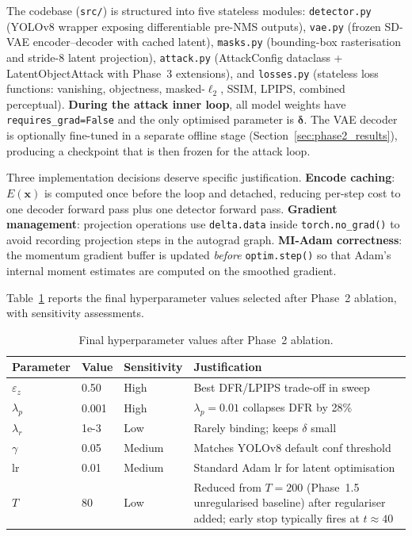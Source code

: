 \documentclass[12pt,a4paper]{report}
\begin{document}
The codebase (\texttt{src/}) is structured into five stateless modules:
\texttt{detector.py} (YOLOv8 wrapper exposing differentiable pre-NMS outputs),
\texttt{vae.py} (frozen SD-VAE encoder--decoder with cached latent),
\texttt{masks.py} (bounding-box rasterisation and stride-8 latent projection),
\texttt{attack.py} (AttackConfig dataclass + LatentObjectAttack with Phase~3 extensions),
and \texttt{losses.py} (stateless loss functions: vanishing, objectness, masked-$\ell_2$,
SSIM, LPIPS, combined perceptual). \textbf{During the attack inner loop}, all model
weights have \texttt{requires\_grad=False} and the only optimised parameter is
$\bm{\delta}$. The VAE decoder is optionally fine-tuned in a separate offline
stage (Section~\ref{sec:phase2_results}), producing a checkpoint that is then
frozen for the attack loop.

Three implementation decisions deserve specific justification.
\textbf{Encode caching}: $E(\mathbf{x})$ is computed once before the loop and detached,
reducing per-step cost to one decoder forward pass plus one detector forward pass.
\textbf{Gradient management}: projection operations use \texttt{delta.data} inside
\texttt{torch.no\_grad()} to avoid recording projection steps in the autograd graph.
\textbf{MI-Adam correctness}: the momentum gradient buffer is updated \emph{before}
\texttt{optim.step()} so that Adam's internal moment estimates are computed on the
smoothed gradient.

Table~\ref{tab:hyperparams_full} reports the final hyperparameter values selected
after Phase~2 ablation, with sensitivity assessments.

\begin{table}[htbp]
  \centering
  \caption{Final hyperparameter values after Phase~2 ablation.}
  \label{tab:hyperparams_full}
  \small
  \begin{tabular}{@{}l l l p{5.5cm}@{}}
    \toprule
    \textbf{Parameter} & \textbf{Value} & \textbf{Sensitivity} & \textbf{Justification} \\
    \midrule
    $\varepsilon_z$    & 0.50   & High   & Best DFR/LPIPS trade-off in sweep \\
    $\lambda_p$        & 0.001  & High   & $\lambda_p{=}0.01$ collapses DFR by 28\% \\
    $\lambda_r$        & 1e-3   & Low    & Rarely binding; keeps $\delta$ small \\
    $\gamma$           & 0.05   & Medium & Matches YOLOv8 default conf threshold \\
    lr                 & 0.01   & Medium & Standard Adam lr for latent optimisation \\
    $T$                & 80     & Low    & Reduced from $T{=}200$ (Phase~1.5 unregularised baseline) after regulariser added; early stop typically fires at $t{\approx}40$ \\
    \bottomrule
  \end{tabular}
\end{table}
\end{document}

